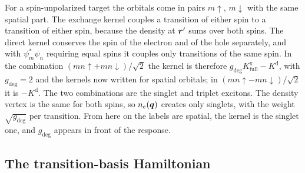 For a spin-unpolarized target the orbitals come in pairs $m\!\uparrow$, $m\!\downarrow$ with the same spatial part. The exchange kernel couples a transition of either spin to a transition of either spin, because the density at $\bm{r}'$ sums over both spins. The direct kernel conserves the spin of the electron and of the hole separately, and with $\psi_m^*\psi_n$ requiring equal spins it couples only transitions of the same spin. In the combination $(mn\!\uparrow + mn\!\downarrow)/\sqrt2$ the kernel is therefore $g_{\mathrm{deg}}K^{\mathrm{x}}_{\mathrm{full}} - K^{\mathrm{d}}$, with $g_{\mathrm{deg}} = 2$ and the kernels now written for spatial orbitals; in $(mn\!\uparrow - mn\!\downarrow)/\sqrt2$ it is $-K^{\mathrm{d}}$. The two combinations are the singlet and triplet excitons. The density vertex is the same for both spins, so $n_e(\bm{q})$ creates only singlets, with the weight $\sqrt{g_{\mathrm{deg}}}$ per transition. From here on the labels are spatial, the kernel is the singlet one, and $g_{\mathrm{deg}}$ appears in front of the response.

\subsection*{The transition-basis Hamiltonian}

